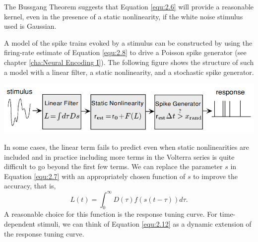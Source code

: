 \begin{rem}
  The Bussgang Theorem suggests that Equation \ref{equ:2.6} will provide a reasonable kernel, even in the presence of a static nonlinearity, if the white noise stimulus used is Gaussian.
\end{rem}

\begin{exm}
  A model of the spike trains evoked by a stimulus can be constructed by using the firing-rate estimate of Equation \ref{equ:2.8} to drive a Poisson spike generator (see chapter \ref{cha:Neural Encoding I}). The following figure shows the structure of such a model with a linear filter, a static nonlinearity, and a stochastic spike generator.
  \begin{center}
    \includegraphics[scale=0.3]{./png/nonlinearGenerator}
  \end{center}
\end{exm}


\begin{rem}
  In some cases, the linear term fails to predict even when static nonlinearities are included and in practice including more terms in the Volterra series is quite difficult to go beyond the first few terms. We can replace the parameter $s$ in Equation \ref{equ:2.7} with an appropriately chosen function of $s$ to improve the accuracy, that is,
  \begin{equation}
    \label{equ:2.12}
    L(t) = \int_0^{\infty}D(\tau)f(s(t-\tau))d\tau.
  \end{equation}
  A reasonable choice for this function is the response tuning curve.
  For time-dependent stimuli, we can think of Equation \ref{equ:2.12} as a dynamic extension of the response tuning curve.
\end{rem}




 










